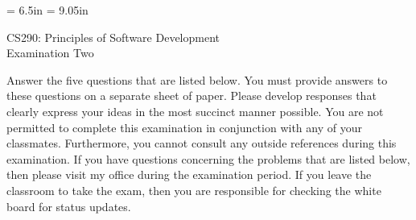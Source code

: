 \textwidth = 6.5in
\textheight = 9.05in
\topmargin 0.0in
\oddsidemargin 0.0in
\evensidemargin 0.0in


\setcounter{secnumdepth}{3}
\setcounter{tocdepth}{3}

        
\def\widow#1{\vskip #1\vbadness10000\penalty-200\vskip-#1}


\def\littlesection#1{
\widow{2cm}
\vskip 0.5cm
\noindent{\bf #1}
\vskip 0.1cm
\noindent
}


\newdimen\tmpdim
\long{}

\renewcommand{\baselinestretch}{1.2}    %
\newtheorem{principle}{Principle}
\newtheorem{definition}{Definition}



\def\widow#1{\vskip #1\vbadness10000\penalty-200\vskip-#1}

\begin{center}

CS290: Principles of Software Development \\
Examination Two \\

\end{center}

\noindent
Answer the five questions that are listed below.  You must provide
answers to these questions on a separate sheet of paper.  Please
develop responses that clearly express your ideas in the most succinct
manner possible.  You are not permitted to complete this examination
in conjunction with any of your classmates.  Furthermore, you cannot
consult any outside references during this examination.  If you have
questions concerning the problems that are listed below, then please
visit my office during the examination period.  If you leave the
classroom to take the exam, then you are responsible for checking the
white board for status updates.

